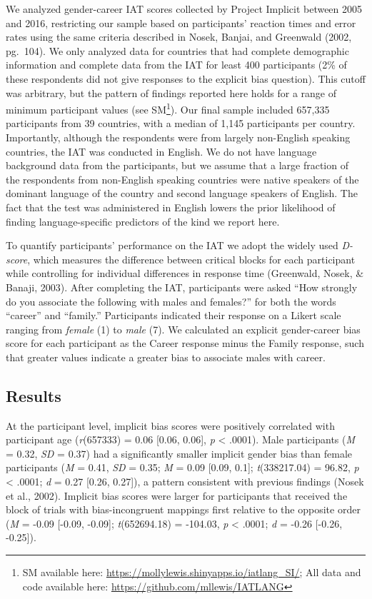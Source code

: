 \documentclass[man,floatsintext]{apa6}
\let\rmarkdownfootnote\footnote%
\def\footnote{\protect\rmarkdownfootnote}
\begin{document}
We analyzed gender-career IAT scores collected by Project Implicit between 2005 and 2016, restricting our sample based on participants' reaction times and error rates using the same criteria described in Nosek, Banjai, and Greenwald (2002, pg.~104). We only analyzed data for countries that had complete demographic information and complete data from the IAT for least 400 participants (2\% of these respondents did not give responses to the explicit bias question). This cutoff was arbitrary, but the pattern of findings reported here holds for a range of minimum participant values (see SM\footnote{SM available here: \url{https://mollylewis.shinyapps.io/iatlang_SI/}; All data and code available here: \url{https://github.com/mllewis/IATLANG}}). Our final sample included 657,335 participants from 39 countries, with a median of 1,145 participants per country. Importantly, although the respondents were from largely non-English speaking countries, the IAT was conducted in English. We do not have language background data from the participants, but we assume that a large fraction of the respondents from non-English speaking countries were native speakers of the dominant language of the country and second language speakers of English. The fact that the test was administered in English lowers the prior likelihood of finding language-specific predictors of the kind we report here.

To quantify participants' performance on the IAT we adopt the widely used \emph{D-score}, which measures the difference between critical blocks for each participant while controlling for individual differences in response time (Greenwald, Nosek, \& Banaji, 2003). After completing the IAT, participants were asked \enquote{How strongly do you associate the following with males and females?} for both the words \enquote{career} and \enquote{family.} Participants indicated their response on a Likert scale ranging from \emph{female} (1) to \emph{male} (7). We calculated an explicit gender-career bias score for each participant as the Career response minus the Family response, such that greater values indicate a greater bias to associate males with career.

\hypertarget{results}{%
\subsection{Results}\label{results}}

At the participant level, implicit bias scores were positively correlated with
participant age (\emph{r}(657333) = 0.06 {[}0.06, 0.06{]}, \emph{p} \textless{} .0001). Male participants (\emph{M} = 0.32, \emph{SD} = 0.37) had a significantly smaller implicit gender bias than female participants (\emph{M} = 0.41, \emph{SD} = 0.35; \emph{M} = 0.09 {[}0.09, 0.1{]}; \emph{t}(338217.04) = 96.82, \emph{p} \textless{} .0001; \emph{d} = 0.27 {[}0.26, 0.27{]}), a pattern consistent with previous findings (Nosek et al., 2002). Implicit bias scores were larger for participants that received the block of trials with bias-incongruent mappings first relative to the opposite order (\emph{M} = -0.09 {[}-0.09, -0.09{]}; \emph{t}(652694.18) = -104.03, \emph{p} \textless{} .0001; \emph{d} = -0.26 {[}-0.26, -0.25{]}).
\end{document}

